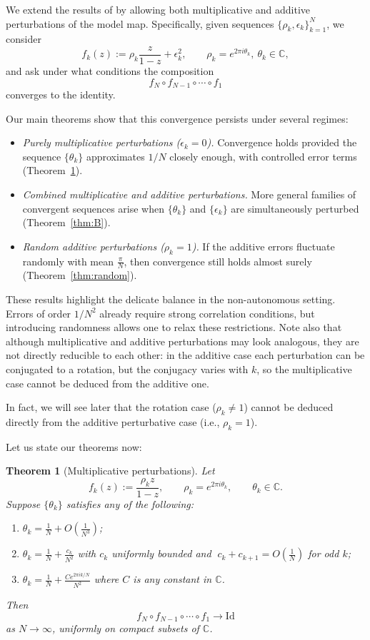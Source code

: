 \documentclass{amsart}
\newtheorem{mainthm}{Theorem}
\theoremstyle{remark}
\theoremstyle{definition}
\begin{document}
We extend the results of \cite{Viv20} by allowing both multiplicative and additive perturbations of the model map.  
Specifically, given sequences $\{\rho_{k},\epsilon_{k}\}_{k=1}^{N}$, we consider
\[
   f_{k}(z):=\rho_k\frac{z}{1-z}+\epsilon_{k}^2,
   \qquad \rho_k = e^{2\pi i \theta_k}, \ \theta_k\in\mathbb{C},
\]
and ask under what conditions the composition
\[
   f_N\circ f_{N-1}\circ \cdots\circ f_1
\]
converges to the identity.  

Our main theorems show that this convergence persists under several regimes:
\begin{itemize}
   \item \textit{Purely multiplicative perturbations ($\epsilon_k=0$).} Convergence holds provided the sequence $\{\theta_k\}$ approximates $1/N$ closely enough, with controlled error terms (Theorem~\ref{thm:A}).
   \item \textit{Combined multiplicative and additive perturbations.} More general families of convergent sequences arise when $\{\theta_k\}$ and $\{\epsilon_k\}$ are simultaneously perturbed (Theorem~\ref{thm:B}).
   \item \textit{Random additive perturbations ($\rho_k=1$).} If the additive errors fluctuate randomly with mean $\frac{\pi}{N}$, then convergence still holds almost surely (Theorem~\ref{thm:random}). 
\end{itemize}

These results highlight the delicate balance in the non-autonomous setting.  
Errors of order $1/N^2$ already require strong correlation conditions, but introducing randomness allows one to relax these restrictions.  
Note also that although multiplicative and additive perturbations may look analogous, they are not directly reducible to each other: in the additive case each perturbation can be conjugated to a rotation, but the conjugacy varies with $k$, so the multiplicative case cannot be deduced from the additive one.  

In fact, we will see later that the rotation case ($\rho_k\neq 1$) cannot be deduced directly from the additive perturbative case (i.e., $\rho_k=1$).

Let us state our theorems now:

\begin{mainthm}[Multiplicative perturbations]\label{thm:A}
Let
\[
   f_k(z):= \frac{\rho_k z}{1-z}, 
   \qquad \rho_k = e^{2\pi i\theta_k},\qquad \theta_k\in\mathbb{C}.
\]
Suppose $\{\theta_k\}$ satisfies any of the following:
\begin{enumerate}
   \item $\displaystyle \theta_k = \frac{1}{N} + O\!\left(\tfrac{1}{N^3}\right)$;
   \item $\displaystyle \theta_k = \frac{1}{N} + \frac{c_k}{N^2}$ with $c_k$ uniformly bounded and $\; c_k+c_{k+1} = O\!\left(\tfrac{1}{N}\right)$ for odd $k$;
   \item $\displaystyle \theta_k = \frac{1}{N} + \frac{Ce^{2\pi i k/N}}{N^2}$ where $C$ is any constant in $\mathbb{C}$.
\end{enumerate}
Then 
\[
   f_N\circ f_{N-1}\circ \cdots\circ f_1 \longrightarrow \mathrm{Id}
\]
as $N\to\infty$, uniformly on compact subsets of $\mathbb{C}$.
\end{mainthm}
\end{document}
